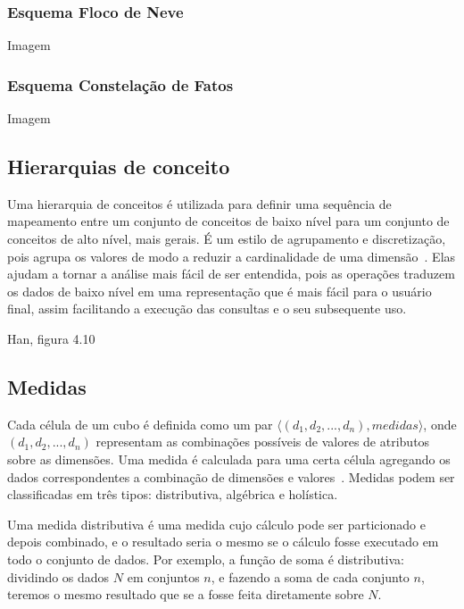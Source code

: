 \subsubsection{Esquema Floco de Neve}
\label{ch:fun:cube:dimm:snow}

{\color{red} Imagem}

\subsubsection{Esquema Constelação de Fatos}
\label{ch:fun:cube:dimm:constellation}

{\color{red} Imagem}

\subsection{Hierarquias de conceito}
\label{ch:fun:cube:concept}

Uma hierarquia de conceitos é utilizada para definir uma sequência de mapeamento entre um conjunto de conceitos de baixo nível para um conjunto de conceitos de alto nível, mais gerais.
É um estilo de agrupamento e discretização, pois agrupa os valores de modo a reduzir a cardinalidade de uma dimensão~\cite{hanDataMiningConcepts2011}.
Elas ajudam a tornar a análise mais fácil de ser entendida, pois as operações traduzem os dados de baixo nível em uma representação que é mais fácil para o usuário final, assim facilitando a execução das consultas e o seu subsequente uso.

{\color{red} Han, figura 4.10}

\subsection{Medidas}
\label{ch:fun:cube:measures}

Cada célula de um cubo é definida como um par $\langle (d_1, d_2, ..., d_n), medidas\rangle$, onde $(d_1, d_2, ..., d_n)$ representam as combinações possíveis de valores de atributos sobre as dimensões.
Uma medida é calculada para uma certa célula agregando os dados correspondentes a combinação de dimensões e valores~\cite{hanDataMiningConcepts2011}.
Medidas podem ser classificadas em três tipos: distributiva, algébrica e holística.

Uma medida distributiva é uma medida cujo cálculo pode ser particionado e depois combinado, e o resultado seria o mesmo se o cálculo fosse executado em todo o conjunto de dados.
Por exemplo, a função de soma é distributiva: dividindo os dados $N$ em conjuntos $n$, e fazendo a soma de cada conjunto $n$, teremos o mesmo resultado que se a fosse feita diretamente sobre $N$.

